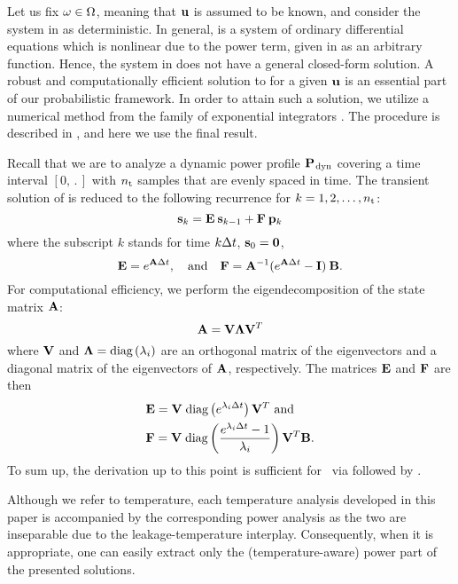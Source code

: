 Let us fix $\omega \in \Omega$, meaning that $\mathbf{u}$ is assumed to be known, and consider the system in  as deterministic.
In general,  is a system of ordinary differential equations which is nonlinear due to the power term, given in  as an arbitrary function.
Hence, the system in  does not have a general closed-form solution.
A robust and computationally efficient solution to  for a given $\mathbf{u}$ is an essential part of our probabilistic framework.
In order to attain such a solution, we utilize a numerical method from the family of exponential integrators \cite{hochbruck2010}.
The procedure is described in , and here we use the final result.

Recall that we are to analyze a dynamic power profile $\mathbf{P}_{\text{\kern0.1emdyn}}$ covering a time interval $[0, \period]$ with ${n_\text{t}}$ samples that are evenly spaced in time.
The transient solution of  is reduced to the following recurrence for $k = 1, 2, \dots, {n_\text{t}}$:
\begin{equation} \elab{recurrence}
  \vs_k = \mE \: \vs_{k - 1} + \mF \: \vp_k
\end{equation}
where the subscript $k$ stands for time $k \Delta t$, $\mathbf{s}_0 = \mathbf{0}$,
\[
  \mathbf{E} = e^{\mathbf{A} \Delta t}, \hspace{1em} \text{and} \hspace{1em} \mathbf{F} = \mathbf{A}^{-1} (e^{\mathbf{A} \Delta t} - \mathbf{I}) \: \mathbf{B}.
\]
For computational efficiency, we perform the eigendecomposition of the state matrix $\mathbf{A}$:
\begin{equation} \elab{eigendecomposition}
  \mA = \mEDV \mEDL \mEDV^T
\end{equation}
where $\mathbf{V}$ and $\mathbf{\Lambda} = \text{diag}\left( \lambda_i \right)$ are an orthogonal matrix of the eigenvectors and a diagonal matrix of the eigenvectors of $\mathbf{A}$, respectively.
The matrices $\mathbf{E}$ and $\mathbf{F}$ are then
\begin{align*}
  & \mathbf{E} = \mathbf{V} \; \text{diag}\left( e^{\lambda_i \Delta t} \right) \mathbf{V}^T \text{ and} \\
  & \mathbf{F} = \mathbf{V} \; \text{diag}\left(  \frac{e^{\lambda_i \Delta t} - 1}{\lambda_i}  \right) \mathbf{V}^T \mathbf{B}.
\end{align*}
To sum up, the derivation up to this point is sufficient for \tta\ via  followed by .
\begin{remark}
Although we refer to temperature, each temperature analysis developed in this paper is accompanied by the corresponding power analysis as the two are inseparable due to the leakage-temperature interplay.
Consequently, when it is appropriate, one can easily extract only the (temperature-aware) power part of the presented solutions.
\end{remark}


